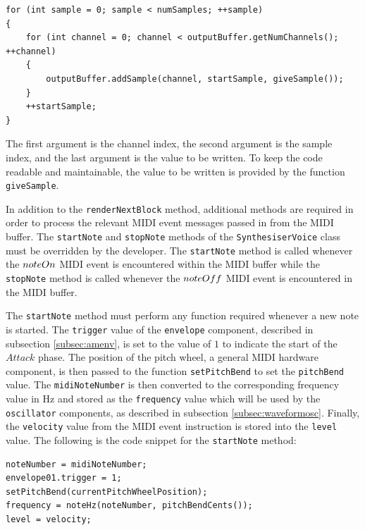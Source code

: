 \documentclass[a4paper,12pt]{report}
\begin{document}
 \noindent\begin{minipage}{\linewidth} \begin{lstlisting}[caption={\texttt{addSample()}},label={code:addsample},captionpos=b]
for (int sample = 0; sample < numSamples; ++sample)
{
    for (int channel = 0; channel < outputBuffer.getNumChannels(); ++channel)
    {
        outputBuffer.addSample(channel, startSample, giveSample());
    }
    ++startSample;
}
\end{lstlisting} \end{minipage}

The first argument is the channel index, the second argument is the sample index, and the last argument is the value to be written. To keep the code readable and maintainable, the value to be written is provided by the function \texttt{give\-Sample}. 

In addition to the \texttt{render\-Next\-Block} method, additional methods are required in order to process the relevant MIDI event messages passed in from the MIDI buffer. The \texttt{start\-Note} and \texttt{stop\-Note} methods of the \texttt{Synthesiser\-Voice} class must be overridden by the developer. The \texttt{start\-Note} method is called whenever the $note\-On$ MIDI event is encountered within the MIDI buffer while the \texttt{stop\-Note} method is called whenever the $note\-Off$ MIDI event is encountered in the MIDI buffer.	

The \texttt{start\-Note} method must perform any function required whenever a new note is started. The \texttt{trigger} value of the \texttt{envelope} component, described in subsection \ref{subsec:amenv}, is set to the value of $1$ to indicate the start of the $Attack$ phase. The position of the pitch wheel, a general MIDI hardware component, is then passed to the function \texttt{set\-Pitch\-Bend} to set the \texttt{pitch\-Bend} value. The \texttt{midi\-Note\-Number} is then converted to the corresponding frequency value in Hz and stored as the \texttt{frequency} value which will be used by the \texttt{oscillator} components, as described in subsection \ref{subsec:waveformosc}. Finally, the \texttt{velocity} value from the MIDI event instruction is stored into the \texttt{level} value. The following is the code snippet for the \texttt{start\-Note} method:

 \noindent\begin{minipage}{\linewidth} \begin{lstlisting}[caption={\texttt{startNote()}},label={code:startnote},captionpos=b]
noteNumber = midiNoteNumber;
envelope01.trigger = 1;
setPitchBend(currentPitchWheelPosition);
frequency = noteHz(noteNumber, pitchBendCents());
level = velocity;
\end{lstlisting} \end{minipage}
\end{document}
